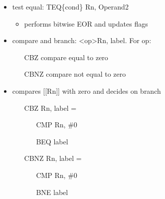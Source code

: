 \documentclass[12pt]{report}
\begin{document}
\begin{itemize}
    \item test equal: TEQ\{cond\} Rn, Operand2
    \begin{itemize}
      \item performs bitwise EOR and updates flags
    \end{itemize}
    \item compare and branch: \textless op\textgreater Rn, label. For op:
    \begin{itemize}
      \item[CBZ] compare equal to zero
      \item[CBNZ] compare not equal to zero
    \end{itemize}
    \item compares [[Rn]] with zero and decides on branch
    \begin{itemize}
      \item[CBZ] Rn, label =
      \begin{itemize}
        \item[CMP] Rn, \#0
        \item[BEQ] label
      \end{itemize}
      \item[CBNZ] Rn, label =
      \begin{itemize}
        \item[CMP] Rn, \#0
        \item[BNE] label
      \end{itemize}
    \end{itemize}
  \end{itemize}
\end{document}
